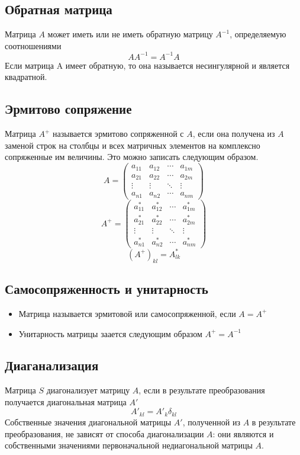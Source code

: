 \documentclass[a4paper,12pt]{article}
\begin{document}
\subsection{Обратная матрица}
Матрица $A$ может иметь или не иметь обратную матрицу $A^{-1}$, определяемую соотношениями
\begin{equation}
A A^{-1}=A^{-1} A
\end{equation}
Если матрица A имеет обратную, то она называется несингулярной и является квадратной.
\subsection{Эрмитово сопряжение}
Матрица $A^+$  называется эрмитово сопряженной с $A$, если она получена из $A$ заменой строк на столбцы и всех матричных элементов на комплексно сопряженные им величины. Это можно записать следующим образом.
\begin{equation}
A = \begin{pmatrix}
a_{11} & a_{12} & \cdots & a_{1m} \\
a_{21} & a_{22} & \cdots & a_{2m} \\         
\vdots & \vdots & \ddots & \vdots \\
a_{n1} & a_{n2} & \cdots & a_{nm}
\end{pmatrix}
\end{equation}
\begin{equation}
A^+ = \begin{pmatrix}
a^*_{11} & a^*_{12} & \cdots & a^*_{1m} \\
a^*_{21} & a^*_{22} & \cdots & a^*_{2m} \\         
\vdots & \vdots & \ddots & \vdots \\
a^*_{n1} & a^*_{n2} & \cdots & a^*_{nm}
\end{pmatrix}
\end{equation}
\begin{equation}
(A^+)_{kl}=A^*_{lk}
\end{equation}
\subsection{Самосопряженность и унитарность}
\begin{itemize}
\item Матрица называется эрмитовой или самосопряженной, если $A=A^+$
\item Унитарность матрицы заается следующим образом $A^+=A^{-1}$
\end{itemize}
\subsection{Диаганализация}
Матрица $S$ диагонализует матрицу $A$, если в результате преобразования получается диагональная матрица $A'$
\begin{equation}
A'_{kl}=A'_k \delta_{kl}
\end{equation}
Собственные значения диагональной матрицы $A'$, полученной из $A$ в результате преобразования, не зависят от способа диагонализации $A$: они являются и собственными значениями первоначальной недиагональной матрицы $A$.
\end{document}
